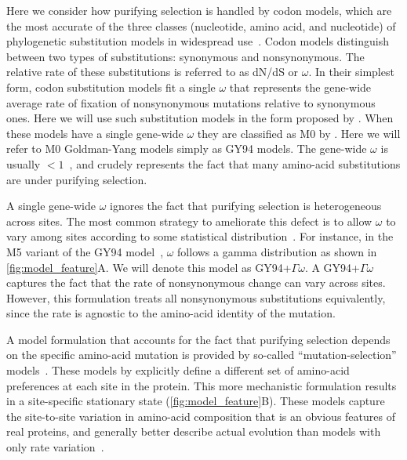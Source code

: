 \documentclass[11pt]{article}
\begin{document}
Here we consider how purifying selection is handled by codon models, which are the most accurate of the three classes (nucleotide, amino acid, and nucleotide) of phylogenetic substitution models in widespread use~\citep{arenas2015trends}.
Codon models distinguish between two types of substitutions: synonymous and nonsynonymous.
The relative rate of these substitutions is referred to as dN/dS or $\omega$.
In their simplest form, codon substitution models fit a single $\omega$ that represents the gene-wide average rate of fixation of nonsynonymous mutations relative to synonymous ones.
Here we will use such substitution models in the form proposed by \citet{goldman1994codon}.
When these models have a single gene-wide $\omega$ they are classified as M0 by \citet{yang2000codon}.
Here we will refer to M0 Goldman-Yang models simply as GY94 models. 
The gene-wide $\omega$ is usually $<1$~\citep{murrell2015gene}, and crudely represents the fact that many amino-acid substitutions are under purifying selection.

A single gene-wide $\omega$ ignores the fact that purifying selection is heterogeneous across sites.
The most common strategy to ameliorate this defect is to allow $\omega$ to vary among sites according to some statistical distribution~\citep{yang1994maximum,yang2000codon}.
For instance, in the M5 variant of the GY94 model~\citep{yang2000codon}, $\omega$ follows a gamma distribution as shown in \ref{fig:model_feature}A.
We will denote this model as GY94+$\Gamma\omega$.
A GY94+$\Gamma\omega$ captures the fact that the rate of nonsynonymous change can vary across sites. 
However, this formulation treats all nonsynonymous substitutions equivalently, since the rate is agnostic to the amino-acid identity of the mutation. 

A model formulation that accounts for the fact that purifying selection depends on the specific amino-acid mutation is provided by so-called ``mutation-selection'' models~\citep{halpern1998evolutionary,yang2008mutation,rodrigue2010mutation,tamuri2012estimating,mccandlish2014modeling}.
These models by explicitly define a different set of amino-acid preferences at each site in the protein. 
This more mechanistic formulation results in a site-specific stationary state (\ref{fig:model_feature}B). 
These models capture the site-to-site variation in amino-acid composition that is an obvious features of real proteins, and generally better describe actual evolution than models with only rate variation~\citep{lartillot2004bayesian, le2008phylogenetic, rodrigue2010mutation,hilton2017phydms,bloom2014experimentally}.
\end{document}
